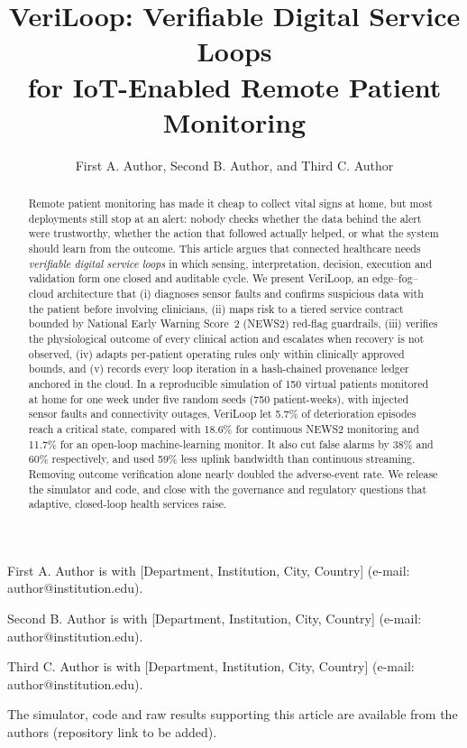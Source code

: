 \documentclass[journal,twoside,web]{IEEEmiot}
\title{VeriLoop: Verifiable Digital Service Loops\\ for IoT-Enabled Remote Patient Monitoring}
\author{{First A. Author, Second B. Author, and Third C. Author}}
\begin{document}
\maketitle



\begin{firstfootnote}
First A. Author is with [Department, Institution, City, Country] (e-mail: author@institution.edu).

Second B. Author is with [Department, Institution, City, Country] (e-mail: author@institution.edu).

Third C. Author is with [Department, Institution, City, Country] (e-mail: author@institution.edu).

The simulator, code and raw results supporting this article are available from the authors (repository link to be added).
\end{firstfootnote}

\bodyfont

\begin{abstract}
Remote patient monitoring has made it cheap to collect vital signs at home, but most deployments still stop at an alert:
nobody checks whether the data behind the alert were trustworthy, whether the action that followed actually helped, or
what the system should learn from the outcome. This article argues that connected healthcare needs \emph{verifiable
digital service loops} in which sensing, interpretation, decision, execution and validation form one closed and
auditable cycle. We present VeriLoop, an edge--fog--cloud architecture that (i) diagnoses sensor faults and confirms
suspicious data with the patient before involving clinicians, (ii) maps risk to a tiered service contract bounded by
National Early Warning Score~2 (NEWS2) red-flag guardrails, (iii) verifies the physiological outcome of every clinical
action and escalates when recovery is not observed, (iv) adapts per-patient operating rules only within clinically
approved bounds, and (v) records every loop iteration in a hash-chained provenance ledger anchored in the cloud. In a
reproducible simulation of 150 virtual patients monitored at home for one week under five random seeds (750 patient-weeks), with injected sensor faults and
connectivity outages, VeriLoop let 5.7\% of deterioration episodes reach a critical state, compared with 18.6\% for
continuous NEWS2 monitoring and 11.7\% for an open-loop machine-learning monitor. It also cut false alarms by 38\% and
60\% respectively, and used 59\% less uplink bandwidth than continuous streaming. Removing outcome verification alone
nearly doubled the adverse-event rate. We release the simulator and code, and close with the governance and
regulatory questions that adaptive, closed-loop health services raise.
\end{abstract}
\end{document}
